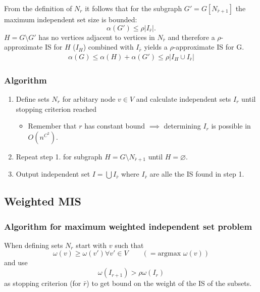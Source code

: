 \documentclass{beamer}
\begin{document}
\begin{frame}
From the definition of $N_r$ it follows that for the subgraph $G' = G[N_{\bar r+1}]$ the maximum independent set size is bounded:
\begin{equation*}
\alpha(G') \leq \rho|I_{\bar r}|.
\end{equation*}
$H = G\setminus G'$ has no vertices adjacent to vertices in $N_{\bar r}$ and therefore a $\rho$-approximate IS for $H$ ($I_H$) combined with $I_{\bar r}$ yields a $\rho$-approximate IS for G.
\begin{align*}
\alpha(G) \leq \alpha(H) + \alpha(G') \leq \rho|I_H \cup I_{\bar r}|
\end{align*}
\end{frame}

\begin{frame}
\frametitle{Algorithm}
\begin{enumerate}
\item Define sets $N_r$ for arbitary node $v \in V$ and calculate independent sets $I_r$ until stopping criterion reached
\begin{itemize}
\item Remember that $r$ has constant bound $\implies$ determining $I_r$ is possible in $O(n^{C^2})$.
\end{itemize}
\item Repeat step 1. for subgraph $H= G \setminus N_{\bar r +1}$ until $H = \varnothing$.
\item Output independent set $I = \bigcup I_{\bar r}$ where $I_{\bar r}$ are alle the IS found in step 1. 
\end{enumerate}
\end{frame}

\subsection{Weighted MIS}
\begin{frame}
\frametitle{Algorithm for maximum weighted independent set problem}
When defining sets $N_r$ start with $v$ such that 
\begin{equation*}
\omega(v) \geq \omega(v') \forall v' \in V \qquad (=\text{argmax } \omega(v)) 
\end{equation*}and use
\begin{equation*}
\omega(I_{r+1}) > \rho \omega(I_r)
\end{equation*}as stopping criterion (for $\bar r$) to get bound on the weight of the IS of the subsets.
\end{frame}
\end{document}
